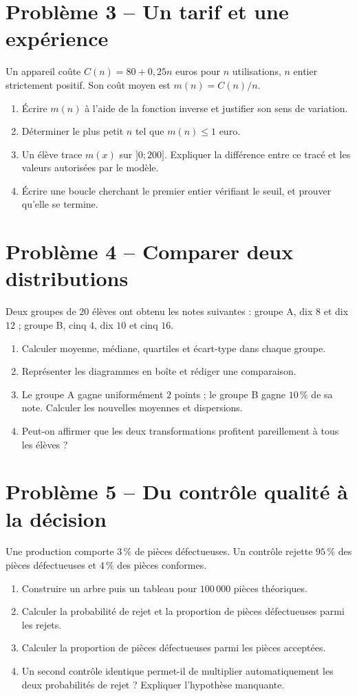 \section*{Problème 3 -- Un tarif et une expérience}
Un appareil coûte $C(n)=80+0{,}25n$ euros pour $n$ utilisations, $n$ entier strictement positif. Son coût moyen est $m(n)=C(n)/n$.
\begin{enumerate}
\item Écrire $m(n)$ à l'aide de la fonction inverse et justifier son sens de variation.
\item Déterminer le plus petit $n$ tel que $m(n)\le1$ euro.
\item Un élève trace $m(x)$ sur $]0;200]$. Expliquer la différence entre ce tracé et les valeurs autorisées par le modèle.
\item Écrire une boucle cherchant le premier entier vérifiant le seuil, et prouver qu'elle se termine.
\end{enumerate}

\section*{Problème 4 -- Comparer deux distributions}
Deux groupes de $20$ élèves ont obtenu les notes suivantes : groupe A, dix $8$ et dix $12$ ; groupe B, cinq $4$, dix $10$ et cinq $16$.
\begin{enumerate}
\item Calculer moyenne, médiane, quartiles et écart-type dans chaque groupe.
\item Représenter les diagrammes en boîte et rédiger une comparaison.
\item Le groupe A gagne uniformément $2$ points ; le groupe B gagne $10\,\%$ de sa note. Calculer les nouvelles moyennes et dispersions.
\item Peut-on affirmer que les deux transformations profitent pareillement à tous les élèves ?
\end{enumerate}

\section*{Problème 5 -- Du contrôle qualité à la décision}
Une production comporte $3\,\%$ de pièces défectueuses. Un contrôle rejette $95\,\%$ des pièces défectueuses et $4\,\%$ des pièces conformes.
\begin{enumerate}
\item Construire un arbre puis un tableau pour $100\,000$ pièces théoriques.
\item Calculer la probabilité de rejet et la proportion de pièces défectueuses parmi les rejets.
\item Calculer la proportion de pièces défectueuses parmi les pièces acceptées.
\item Un second contrôle identique permet-il de multiplier automatiquement les deux probabilités de rejet ? Expliquer l'hypothèse manquante.
\end{enumerate}

